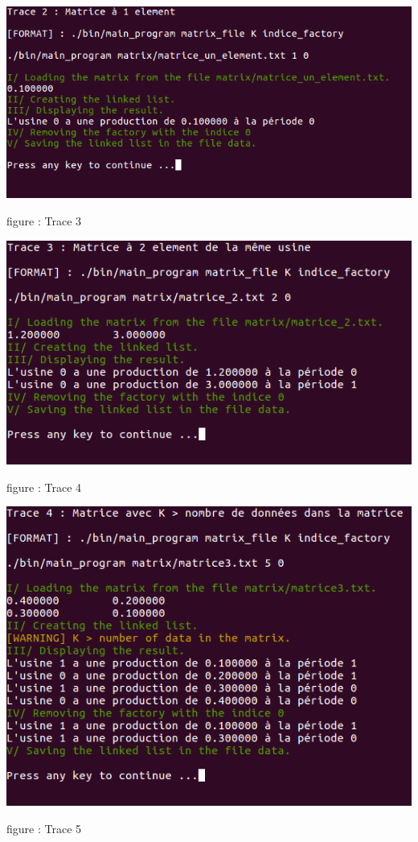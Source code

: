 \documentclass[a4paper]{article}
\begin{document}
\begin{center}
\includegraphics[scale=0.4]{trace_3.png}

figure : Trace 3
\end{center}

\begin{center}
\includegraphics[scale=0.4]{trace_4.png}

figure : Trace 4
\end{center}
\begin{center}
\includegraphics[scale=0.4]{trace_5.png}

figure : Trace 5
\end{center}
\end{document}
